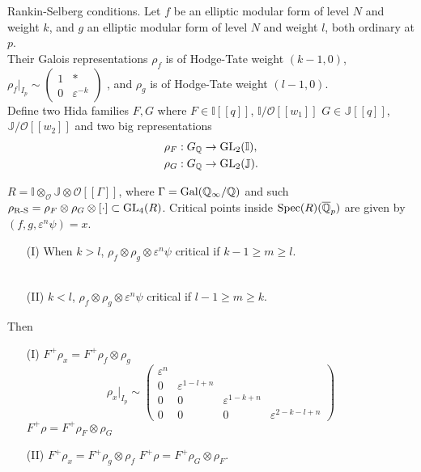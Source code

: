 \documentclass[12pt,amsfont]{amsart}
\begin{document}
\begin{xmp} Rankin-Selberg conditions.  Let 
$f$ be an elliptic modular form of level $N$ and weight $k$, and $g$ an elliptic modular form of level $N$ and weight $l$, both ordinary at $p$. \\
Their Galois representations $\rho_f$ is of Hodge-Tate weight $(k-1, 0)$, $\rho_f |_{I_p} \sim \begin{pmatrix} 1 & \ast \\ 0 & \varepsilon^{-k} \end{pmatrix}$ , and $\rho_g$ is of Hodge-Tate weight $(l-1, 0)$.\\
Define two Hida families $F,G$ where $F \in \mathbb{I}[[q]]$, $\mathbb{I}/\mathcal{O}[[w_1]]$
$G \in \mathbb{J}[[q]]$, $\mathbb{J}/\mathcal{O}[[w_2]]$  and two big  representations 
\begin{align*} 
\rho_F : G_{\mathbb Q} &\rightarrow \operatorname{GL}_2(\mathbb{I}), \\
\rho_G : G_{\mathbb Q} & \rightarrow \operatorname{GL}_2(\mathbb{J}) .\end{align*}
 
$R = \mathbb{I} \otimes_{\mathcal{O}} \mathbb{J} \otimes \mathcal{O}[[\Gamma]]$, where $\Gamma = \operatorname{Gal}({\mathbb Q}_\infty / {\mathbb Q})$ and such $\rho_{\text{R-S}} = \rho_F \otimes \rho_G \otimes [\cdot ] \subset \operatorname{GL}_4(R)$. Critical points inside $\operatorname{Spec}(R)(\overline{{\mathbb Q}}_p)$ are given by $(f, g, \varepsilon^n \psi) = x$. 
\begin{enumerate}
\item[(I)] When $k > l$, $\rho_f \otimes \rho_g \otimes \varepsilon^n \psi$ critical if $k-1 \geq m \geq l$. \\ \\
\item[(II)] $k < l$, $\rho_f \otimes \rho_g \otimes \varepsilon^n \psi$ critical if $l-1 \geq m \geq k$.
\end{enumerate}
Then
\begin{enumerate}
\item[(I)] $F^+ \rho_x = F^+ \rho_f \otimes \rho_g$
$$\displaystyle \rho_x |_{I_p} \sim \begin{pmatrix} \varepsilon^n &  &  &  \\ 0 & \varepsilon^{1 - l + n} &  &  \\ 0 & 0 & \varepsilon^{1 - k + n} &  \\ 0 & 0 & 0 & \varepsilon^{2 - k - l + n} \end{pmatrix}$$
$F^+ \rho = F^+ \rho_F \otimes \rho_G$
\item[(II)]
$F^+ \rho_x = F^+ \rho_g \otimes \rho_f$
$F^+ \rho = F^+ \rho_G \otimes \rho_F$. 
\end{enumerate}
\end{xmp}
\end{document}
